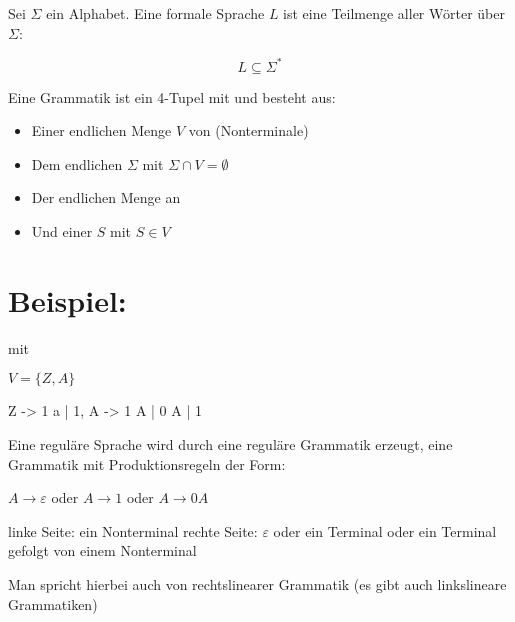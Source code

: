 \documentclass{lehramt-informatik-haupt}
\begin{document}
Sei $\Sigma$ ein Alphabet. Eine formale Sprache $L$ ist eine Teilmenge
aller Wörter über $\Sigma$:

\begin{displaymath}
L \subseteq \Sigma^*
\end{displaymath}

\bigskip

\noindent
Eine Grammatik ist ein 4-Tupel mit \liGrammatik{} und besteht aus:

\begin{itemize}
\item Einer endlichen Menge $V$ von  (Nonterminale)

\item Dem endlichen  $\Sigma$ mit $\Sigma \cap V
= \emptyset$

\item Der endlichen Menge an 

\item Und einer  $S$ mit $S \in V$
\end{itemize}

%

\section{Beispiel:}

\liGrammatik{} mit

$V = \{Z, A\}$


\begin{liProduktionsRegeln}
Z -> 1 a | 1,
A -> 1 A | 0 A | 1
\end{liProduktionsRegeln}

Eine reguläre Sprache wird durch eine reguläre Grammatik erzeugt, \dh
eine Grammatik mit Produktionsregeln der Form:

$A \rightarrow \varepsilon$ oder $A \rightarrow 1$ oder $A \rightarrow 0A$

linke Seite: ein Nonterminal rechte Seite: $\varepsilon$ oder ein Terminal
oder ein Terminal gefolgt von einem Nonterminal

Man spricht hierbei auch von rechtslinearer Grammatik (es gibt auch
linkslineare Grammatiken)

\end{document}
